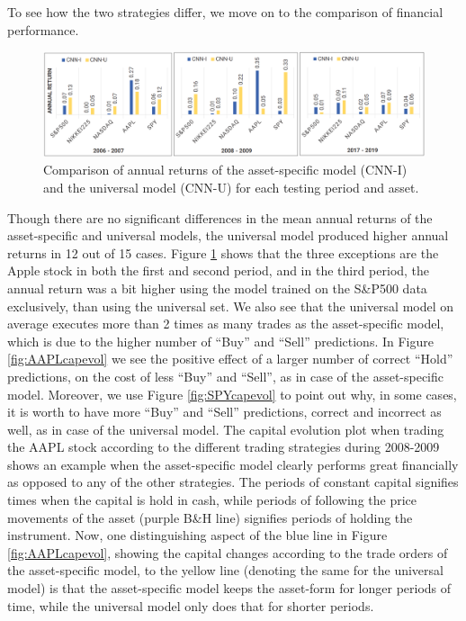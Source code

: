 \documentclass[11pt, a4paper]{article}
\begin{document}
To see how the two strategies differ, we move on to the comparison of financial performance.
\begin{figure}[ht]
    \centering
    \includegraphics[width=\textwidth]{images/CNNIvsCNNU.png}
    \caption{Comparison of annual returns of the asset-specific model (CNN-I) and the universal model (CNN-U) for each testing period and asset.}
    \label{fig:CNNIvsCNNU}
\end{figure}
Though there are no significant differences in the mean annual returns of the asset-specific and universal models, the universal model produced higher annual returns in 12 out of 15 cases. 
Figure \ref{fig:CNNIvsCNNU} shows that the three exceptions are the Apple stock in both the first and second period, and in the third period, the annual return was a bit higher using the model trained on the S\&P500 data exclusively, than using the universal set. We also see that the universal model on average executes more than 2 times as many trades as the asset-specific model, which is due to the higher number of “Buy” and “Sell” predictions. 
In Figure \ref{fig:AAPLcapevol} we see the positive effect of a larger number of correct “Hold” predictions, on the cost of less “Buy” and “Sell”, as in case of the asset-specific model.
Moreover, we use Figure \ref{fig:SPYcapevol} to point out why, in some cases, it is worth to have more “Buy” and “Sell” predictions, correct and incorrect as well, as in case of the universal model. 
The capital evolution plot when trading the AAPL stock according to the different trading strategies during 2008-2009 shows an example when the asset-specific model clearly performs great financially as opposed to any of the other strategies. The periods of constant capital signifies times when the capital is hold in cash, while periods of following the price movements of the asset (purple B\&H line) signifies periods of holding the instrument. Now, one distinguishing aspect of the blue line in Figure \ref{fig:AAPLcapevol}, showing the capital changes according to the trade orders of the asset-specific model, to the yellow line (denoting the same for the universal model) is that the asset-specific model keeps the asset-form for longer periods of time, while the universal model only does that for shorter periods. 
\end{document}
